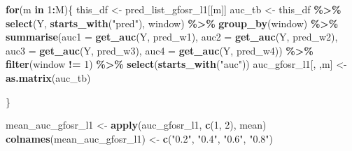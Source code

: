 \documentclass[
]{article}
\newenvironment{Shaded}{\begin{snugshade}}{\end{snugshade}}
\newcommand{\AttributeTok}[1]{\textcolor[rgb]{0.13,0.29,0.53}{#1}}
\newcommand{\ControlFlowTok}[1]{\textcolor[rgb]{0.13,0.29,0.53}{\textbf{#1}}}
\newcommand{\DecValTok}[1]{\textcolor[rgb]{0.00,0.00,0.81}{#1}}
\newcommand{\FunctionTok}[1]{\textcolor[rgb]{0.13,0.29,0.53}{\textbf{#1}}}
\newcommand{\NormalTok}[1]{#1}
\newcommand{\OtherTok}[1]{\textcolor[rgb]{0.56,0.35,0.01}{#1}}
\newcommand{\SpecialCharTok}[1]{\textcolor[rgb]{0.81,0.36,0.00}{\textbf{#1}}}
\newcommand{\StringTok}[1]{\textcolor[rgb]{0.31,0.60,0.02}{#1}}
\begin{document}
\begin{Shaded}
\begin{Highlighting}[]
\ControlFlowTok{for}\NormalTok{(m }\ControlFlowTok{in} \DecValTok{1}\SpecialCharTok{:}\NormalTok{M)\{}
\NormalTok{  this\_df }\OtherTok{\textless{}{-}}\NormalTok{ pred\_list\_gfosr\_l1[[m]]}
\NormalTok{  auc\_tb }\OtherTok{\textless{}{-}}\NormalTok{ this\_df }\SpecialCharTok{\%\textgreater{}\%} 
    \FunctionTok{select}\NormalTok{(Y, }\FunctionTok{starts\_with}\NormalTok{(}\StringTok{"pred"}\NormalTok{), window) }\SpecialCharTok{\%\textgreater{}\%}
    \FunctionTok{group\_by}\NormalTok{(window) }\SpecialCharTok{\%\textgreater{}\%}
    \FunctionTok{summarise}\NormalTok{(}\AttributeTok{auc1 =} \FunctionTok{get\_auc}\NormalTok{(Y, pred\_w1),}
              \AttributeTok{auc2 =} \FunctionTok{get\_auc}\NormalTok{(Y, pred\_w2),}
              \AttributeTok{auc3 =} \FunctionTok{get\_auc}\NormalTok{(Y, pred\_w3),}
              \AttributeTok{auc4 =} \FunctionTok{get\_auc}\NormalTok{(Y, pred\_w4)) }\SpecialCharTok{\%\textgreater{}\%}
    \FunctionTok{filter}\NormalTok{(window }\SpecialCharTok{!=} \DecValTok{1}\NormalTok{) }\SpecialCharTok{\%\textgreater{}\%} 
    \FunctionTok{select}\NormalTok{(}\FunctionTok{starts\_with}\NormalTok{(}\StringTok{"auc"}\NormalTok{))}
\NormalTok{  auc\_gfosr\_l1[, ,m] }\OtherTok{\textless{}{-}} \FunctionTok{as.matrix}\NormalTok{(auc\_tb)}

\NormalTok{\}}


\NormalTok{mean\_auc\_gfosr\_l1 }\OtherTok{\textless{}{-}} \FunctionTok{apply}\NormalTok{(auc\_gfosr\_l1, }\FunctionTok{c}\NormalTok{(}\DecValTok{1}\NormalTok{, }\DecValTok{2}\NormalTok{), mean)}
\FunctionTok{colnames}\NormalTok{(mean\_auc\_gfosr\_l1) }\OtherTok{\textless{}{-}} \FunctionTok{c}\NormalTok{(}\StringTok{"0.2"}\NormalTok{, }\StringTok{"0.4"}\NormalTok{, }\StringTok{"0.6"}\NormalTok{, }\StringTok{"0.8"}\NormalTok{)}
\end{Highlighting}
\end{Shaded}
\end{document}

